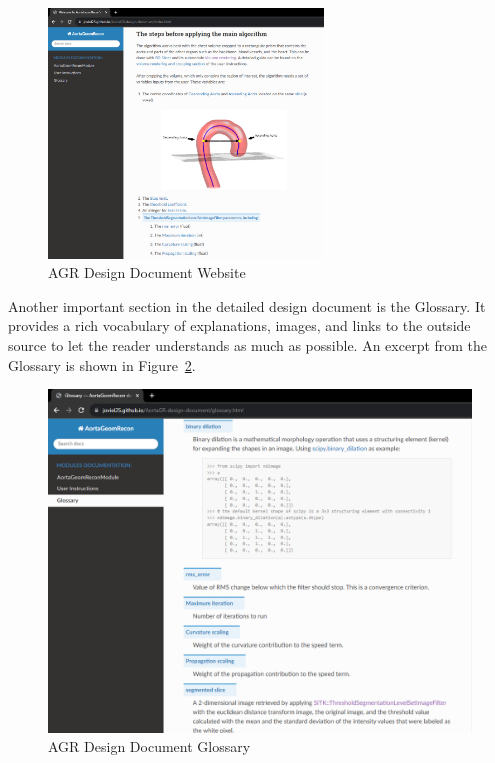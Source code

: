 \begin{figure}[H]
    \centering
    \includegraphics[width=0.65\textwidth]{figures/AC/DD/Main_page.png}
    \caption[AGR Design Document Website]{AGR Design Document Website}
    \label{fig_agr_dd}
\end{figure}

Another important section in the detailed design document is the Glossary. It provides a rich vocabulary of explanations, images, and links to the outside source to let the reader understands as much as possible. An excerpt from the Glossary is shown in Figure~\ref{fig_agr_dd_glossary}.

\begin{figure}[H]
    \centering
    \includegraphics[width=\textwidth]{figures/AC/DD/Glossary.png}
    \caption[AGR Design Document Glossary]{AGR Design Document Glossary}
    \label{fig_agr_dd_glossary}
\end{figure}


